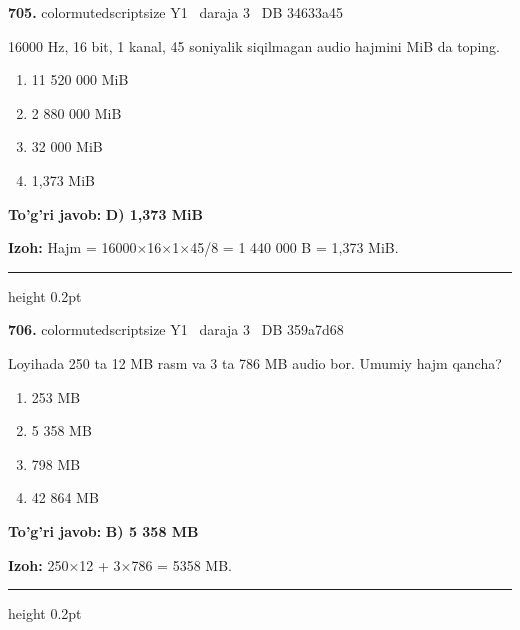 \documentclass[10pt,a4paper,oneside]{article}
\begin{document}
\noindent\textbf{\color{ink}705.}  {color{muted}scriptsize Y1 \textbullet\ daraja 3 \textbullet\ DB 34633a45}
\par
16000 Hz, 16 bit, 1 kanal, 45 soniyalik siqilmagan audio hajmini MiB da toping.
\begin{enumerate}[label=\Alph*),leftmargin=9mm]
\item 11 520 000 MiB
\item 2 880 000 MiB
\item 32 000 MiB
\item 1,373 MiB
\end{enumerate}
\begin{tcolorbox}[enhanced,breakable,colback=teal!4,colframe=teal!50!black,boxrule=0.5pt,arc=1.1mm,left=3mm,right=3mm,top=1.7mm,bottom=1.7mm,before skip=2mm,after skip=2mm]
\textbf{\color{teal}To'g'ri javob:} \textbf{D) 1,373 MiB}
\par\smallskip
\textbf{Izoh:} Hajm = 16000\ensuremath{\times}16\ensuremath{\times}1\ensuremath{\times}45/8 = 1 440 000 B = 1,373 MiB.
\end{tcolorbox}
\vspace{2mm}\hrule height 0.2pt \vspace{3mm}

\noindent\textbf{\color{ink}706.}  {color{muted}scriptsize Y1 \textbullet\ daraja 3 \textbullet\ DB 359a7d68}
\par
Loyihada 250 ta 12 MB rasm va 3 ta 786 MB audio bor. Umumiy hajm qancha?
\begin{enumerate}[label=\Alph*),leftmargin=9mm]
\item 253 MB
\item 5 358 MB
\item 798 MB
\item 42 864 MB
\end{enumerate}
\begin{tcolorbox}[enhanced,breakable,colback=teal!4,colframe=teal!50!black,boxrule=0.5pt,arc=1.1mm,left=3mm,right=3mm,top=1.7mm,bottom=1.7mm,before skip=2mm,after skip=2mm]
\textbf{\color{teal}To'g'ri javob:} \textbf{B) 5 358 MB}
\par\smallskip
\textbf{Izoh:} 250\ensuremath{\times}12 + 3\ensuremath{\times}786 = 5358 MB.
\end{tcolorbox}
\vspace{2mm}\hrule height 0.2pt \vspace{3mm}
\end{document}
